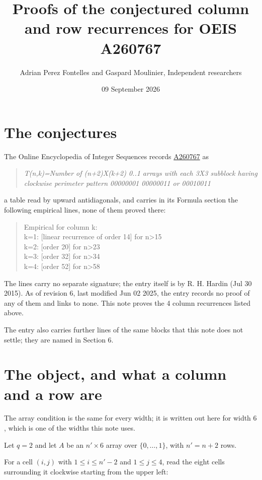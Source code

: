 \documentclass[11pt]{article}
\title{Proofs of the conjectured column and row recurrences for OEIS A260767}
\author{Adrian Perez Fontelles and Gaspard Moulinier, Independent researchers}
\date{09 September 2026}
\theoremstyle{definition}
\begin{document}
\maketitle
\section{The conjectures}

The Online Encyclopedia of Integer Sequences records \href{https://oeis.org/A260767}{A260767} as

\begin{quote}\itshape T(n,k)=Number of (n+2)X(k+2) 0..1 arrays with each 3X3 subblock having clockwise perimeter pattern 00000001 00000011 or 00010011\end{quote}

a table read by upward antidiagonals, and carries in its Formula section the following empirical lines, none of them proved there:

\begin{quote}\ttfamily Empirical for column k:\\
k=1: [linear recurrence of order 14] for n>15\\k=2: [order 20] for n>23\\k=3: [order 32] for n>34\\k=4: [order 52] for n>58\end{quote}

The lines carry no separate signature; the entry itself is by R. H. Hardin (Jul 30 2015). As of revision 6, last modified Jun 02 2025, the entry records no proof of any of them and links to none. This note proves the 4 column recurrences listed above.

The entry also carries further lines of the same blocks that this note does not settle; they are named in Section 6.

\section{The object, and what a column and a row are}

The array condition is the same for every width; it is written out here for width $6$, which is one of the widths this note uses.

Let $q = 2$ and let $A$ be an $n' \times 6$ array over $\{0,\dots,1\}$, with $n' = n + 2$ rows.

For a cell $(i,j)$ with $1 \le i \le n'-2$ and $1 \le j \le 4$, read the eight cells surrounding it clockwise starting from the upper left:
\end{document}
